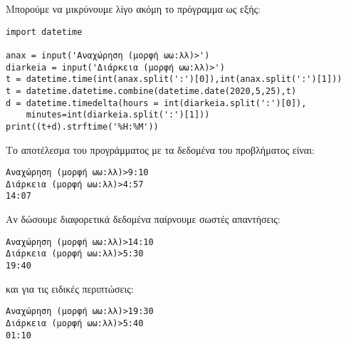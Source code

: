 Μπορούμε να μικρύνουμε λίγο ακόμη το πρόγραμμα ως εξής:
\begin{lstlisting}
import datetime

anax = input('Αναχώρηση (μορφή ωω:λλ)>')
diarkeia = input('Διάρκεια (μορφή ωω:λλ)>')
t = datetime.time(int(anax.split(':')[0]),int(anax.split(':')[1]))
t = datetime.datetime.combine(datetime.date(2020,5,25),t)
d = datetime.timedelta(hours = int(diarkeia.split(':')[0]), 
    minutes=int(diarkeia.split(':')[1]))
print((t+d).strftime('%H:%M'))
\end{lstlisting}

Το αποτέλεσμα του προγράμματος με τα δεδομένα του προβλήματος είναι:
\begin{lstlisting}
Αναχώρηση (μορφή ωω:λλ)>9:10
Διάρκεια (μορφή ωω:λλ)>4:57
14:07
\end{lstlisting}

Αν δώσουμε διαφορετικά δεδομένα παίρνουμε σωστές απαντήσεις:
\begin{lstlisting}
Αναχώρηση (μορφή ωω:λλ)>14:10
Διάρκεια (μορφή ωω:λλ)>5:30
19:40
\end{lstlisting}

και για τις ειδικές περιπτώσεις:
\begin{lstlisting}
Αναχώρηση (μορφή ωω:λλ)>19:30
Διάρκεια (μορφή ωω:λλ)>5:40
01:10
\end{lstlisting}


